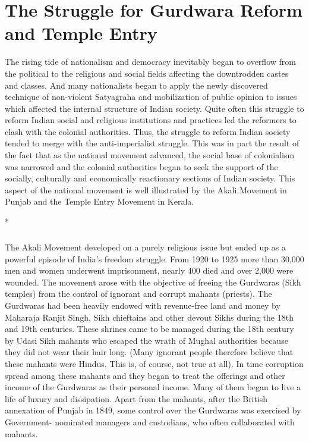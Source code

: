 \chapter[Struggle for Gurdwara Reform and Temple Entry]{The Struggle for Gurdwara Reform and Temple Entry}
\begin{multicols}{2}

The rising tide of nationalism and democracy inevitably began to overflow from the political to the religious and social fields affecting the downtrodden castes and classes. And many nationalists began to apply the newly discovered technique of non-violent Satyagraha and mobilization of public opinion to issues which affected the internal structure of Indian society. Quite often this struggle to reform Indian social and religious institutions and practices led the reformers to clash with the colonial authorities. Thus, the struggle to reform Indian society tended to merge with the anti-imperialist struggle. This was in part the result of the fact that as the national movement advanced, the social base of colonialism was narrowed and the colonial authorities began to seek the support of the socially, culturally and economically reactionary sections of Indian society. This aspect of the national movement is well illustrated by the Akali Movement in Punjab and the Temple Entry Movement in Kerala.

\begin{center}*\end{center}

\paragraph*{}

The Akali Movement developed on a purely religious issue but ended up as a powerful episode of India's freedom struggle. From 1920 to 1925 more than 30,000 men and women underwent imprisonment, nearly 400 died and over 2,000 were wounded. The movement arose with the objective of freeing the Gurdwaras (Sikh temples) from the control of ignorant and corrupt mahants (priests). The Gurdwaras had been heavily endowed with revenue-free land and money by Maharaja Ranjit Singh, Sikh chieftains and other devout Sikhs during the 18th and 19th centuries. These shrines came to be managed during the 18th century by Udasi Sikh mahants who escaped the wrath of Mughal authorities because they did not wear their hair long. (Many ignorant people therefore believe that these mahants were Hindus. This is, of course, not true at all). In time corruption spread among these mahants and they began to treat the offerings and other income of the Gurdwaras as their personal income. Many of them began to live a life of luxury and dissipation. Apart from the mahants, after the British annexation of Punjab in 1849, some control over the Gurdwaras was exercised by Government- nominated managers and custodians, who often collaborated with mahants.


\end{multicols}
